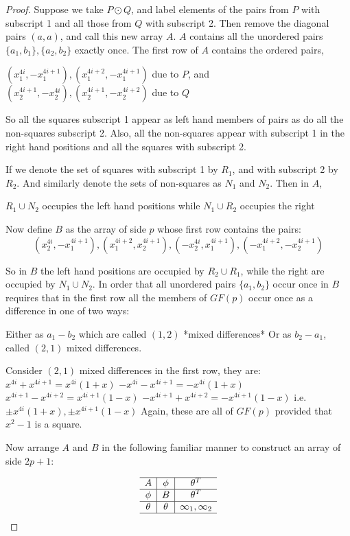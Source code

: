 \documentclass[
  11pt,
  a4paper]{book}
\begin{document}
\begin{proof}
Suppose we take $P \odot Q$, and label elements of the pairs
from $P$ with subscript 1 and all those from $Q$ with
subscript 2. Then remove the diagonal pairs $(a, a)$, and
call this new array $A$. $A$ contains all the unordered
pairs $\{a_1, b_1\},\{a_2, b_2\}$ exactly once. The first row
of $A$ contains the ordered pairs,

$(x_1^{4i}, -x_1^{4i + 1}), (x_1^{4i + 2}, -x_1^{4i + 1})$
due to $P$, and
$(x_2^{4i + 1}, -x_2^{4i}), (x_2^{4i + 1}, -x_2^{4i  +2})$
due to $Q$

So all the squares subscript 1 appear as left hand members
of pairs as do all the non-squares subscript 2. Also, all
the non-squares appear with subscript 1 in the right hand
positions and all the squares with
subscript 2.

If we denote the set of squares with subscript 1 by $R_1$,
and with subscript 2 by $R_2$. And similarly denote the sets
of non-squares as $N_1$ and $N_2$. Then in $A$,

$R_1 \cup N_2$ occupies the left hand positions
while $N_1 \cup R_2$ occupies the right

Now define $B$ as the array of side $p$ whose first row
contains the pairs:
$$(x_2^{4i}, -x_1^{4i + 1}), (x_1^{4i + 2}, x_2^{4i + 1}), (-x_2^{4i}, x_1^{4i + 1}), (-x_1^{4i + 2}, -x_2^{4i + 1})$$

So in $B$ the left hand positions are occupied by
$R_2 \cup R_1$, while the right are occupied by
$N_1 \cup N_2$.  In order that all unordered pairs
$\{a_1, b_2\}$ occur once in $B$ requires that in the first
row all the members of $GF(p)$ occur once as a difference
in one of two ways:

Either as $a_1 - b_2$ which are called $(1, 2)$
*mixed differences* Or as $b_2 - a_1$, called $(2, 1)$
mixed differences.

Consider $(2,1)$ mixed differences in the first row, they
are:
$x^{4i} + x^{4i+1} = x^{4i}(1+x)$
$-x^{4i}-x^{4i+1}=-x^{4i}(1+x)$
$x^{4i+1} - x^{4i+2} = x^{4i+1}(1-x)$
$-x^{4i+1} + x^{4i+2} = -x^{4i+1}(1-x)$
i.e. $\pm x^{4i}(1+x), \pm x^{4i+1}(1-x)$
Again, these are all of $GF(p)$ provided that $x^2- 1$ is a
square.

Now arrange $A$ and $B$ in the following familiar manner to
construct an array of side $2p+1$:

\begin{equation}
\begin{array}{c|c|c}
\hline
      A     &   \phi   &       \theta ^T   \\ \hline
     \phi   &    B     &       \theta ^T   \\ \hline
    \theta  &  \theta  &  \infty _1, \infty _2  \\ \hline
\end{array}
\end{equation}


\end{proof}
\end{document}

